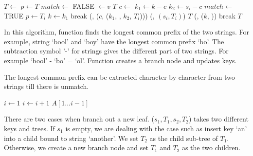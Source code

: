\documentclass[b5paper]{article}
\begin{document}
\begin{algorithmic}[1]
   \State $T \gets$ 
  \EndIf
  \State $p \gets T$
  \Loop
    \State $match \gets$ FALSE
        \State {} $\gets v$ 
        \State \Return $T$
      \EndIf
      \State $c \gets$ 
      \State $k_1 \gets k - c$
      \State $k_2 \gets s_i - c$
        \State $match \gets$ TRUE
         
          \State $p \gets T_i$
          \State $k \gets k_1$
          \State break
        \Else {}
          \State {}(, ($c$, ($k_1$, , $k_2$, $T_i$)))
          \State {}(, $(s_i, T_i)$)
          \State \Return $T$
        \EndIf
      \EndIf
    \EndFor
     
      \State {}(, ($k$, ))
      \State break
    \EndIf
  \EndLoop
  \State \Return $T$
\EndFunction
\end{algorithmic}

In this algorithm, function  finds the longest
common prefix of the two strings. For example, string `bool' and `boy'
have the longest common prefix `bo'. The subtraction symbol '-' for
strings gives the different part of two strings. For example `bool' - `bo' = `ol'. Function  creates a branch node and updates keys.

The longest common prefix can be extracted character by character from two strings till there is unmatch.

\begin{algorithmic}[1]
  \State $i \gets 1 $
    \State $i \gets i + 1$
  \EndWhile
  \State \Return $A[1...i-1]$
\EndFunction
\end{algorithmic}

There are two cases when branch out a new leaf. ($s_1, T_1, s_2, T_2$)
takes two different keys and trees. If $s_1$ is empty, we are
dealing with the case such as insert key `an' into a child bound to
string `another'. We set $T_2$ as the child sub-tree of $T_1$. Otherwise,
we create a new branch node and set $T_1$ and $T_2$ as the two children.
\end{document}
